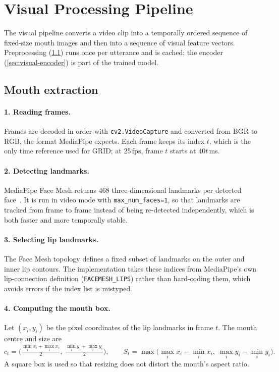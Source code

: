 \section{Visual Processing Pipeline}
\label{sec:visual}

The visual pipeline converts a video clip into a temporally ordered sequence of
fixed-size mouth images and then into a sequence of visual feature vectors.
Preprocessing (\cref{sec:mouth-crop}) runs once per utterance and is cached;
the encoder (\cref{sec:visual-encoder}) is part of the trained model.

\subsection{Mouth extraction}
\label{sec:mouth-crop}

\paragraph{1. Reading frames.} Frames are decoded in order with
\texttt{cv2.VideoCapture} and converted from BGR to RGB, the format MediaPipe
expects. Each frame keeps its index $t$, which is the only time reference used
for GRID; at 25\,fps, frame $t$ starts at $40t$\,ms.

\paragraph{2. Detecting landmarks.} MediaPipe Face Mesh returns 468
three-dimensional landmarks per detected face~\cite{kartynnik2019,aripin2024}.
It is run in video mode with \texttt{max\_num\_faces=1}, so that landmarks are
tracked from frame to frame instead of being re-detected independently, which
is both faster and more temporally stable.

\paragraph{3. Selecting lip landmarks.} The Face Mesh topology defines a fixed
subset of landmarks on the outer and inner lip contours. The implementation
takes these indices from MediaPipe's own lip-connection definition
(\texttt{FACEMESH\_LIPS}) rather than hard-coding them, which avoids errors if
the index list is mistyped.

\paragraph{4. Computing the mouth box.} Let $(x_i, y_i)$ be the pixel
coordinates of the lip landmarks in frame $t$. The mouth centre and size are
\begin{equation}
c_t = \Big(\tfrac{\min_i x_i + \max_i x_i}{2},\; \tfrac{\min_i y_i + \max_i y_i}{2}\Big),
\qquad
S_t = \max\!\big(\max_i x_i - \min_i x_i,\; \max_i y_i - \min_i y_i\big).
\end{equation}
A square box is used so that resizing does not distort the mouth's aspect
ratio.

